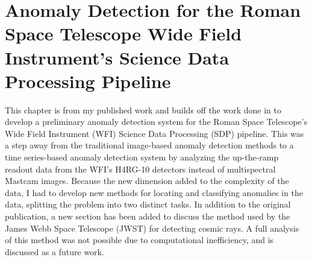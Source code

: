 \chapter[Anomaly Detection for the Roman Space Telescope Wide Field Instrument's Science Data Processing Pipeline]{Anomaly Detection for the Roman Space Telescope Wide Field Instrument's Science Data Processing Pipeline}
\label{ch:rst}
This chapter is from my published work \cite{horton2024anomaly} and builds off the work done in \cite{horton2020novelty} to develop a preliminary anomaly detection system for the Roman Space Telescope's Wide Field Instrument (WFI) Science Data Processing (SDP) pipeline.
This was a step away from the traditional image-based anomaly detection methods to a time series-based anomaly detection system by analyzing the up-the-ramp readout data from the WFI's H4RG-10 detectors instead of multispectral Mastcam images.
Because the new dimension added to the complexity of the data, I had to develop new methods for locating and classifying anomalies in the data, splitting the problem into two distinct tasks.
In addition to the original publication, a new section has been added to discuss the method used by the James Webb Space Telescope (JWST) for detecting cosmic rays. 
A full analysis of this method was not possible due to computational inefficiency, and is discussed as a future work.

